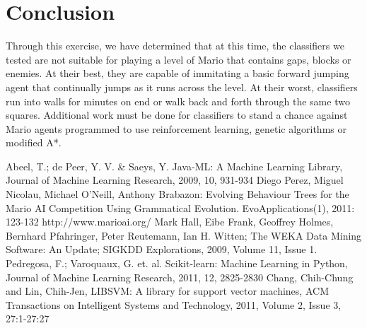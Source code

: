 \documentclass[]{article}   %
\begin{document}
\section{Conclusion}

Through this exercise, we have determined that at this time, the classifiers we tested are not suitable for playing a level of Mario that contains gaps, blocks or enemies.
At their best, they are capable of immitating a basic forward jumping agent that continually jumps as it runs across the level. At their worst, classifiers run into walls for
minutes on end or walk back and forth through the same two squares. Additional work must be done for classifiers to stand a chance against Mario agents programmed to use
reinforcement learning, genetic algorithms or modified A*.


\begin{thebibliography}{9}
  Abeel, T.; de Peer, Y. V. \& Saeys, Y. Java-ML: A Machine Learning Library, Journal of Machine Learning Research, 2009, 10, 931-934
  Diego Perez, Miguel Nicolau, Michael O'Neill, Anthony Brabazon: Evolving Behaviour Trees for the Mario AI Competition Using Grammatical Evolution. EvoApplications(1), 2011: 123-132 http://www.marioai.org/
  Mark Hall, Eibe Frank, Geoffrey Holmes, Bernhard Pfahringer, Peter Reutemann, Ian H. Witten; The WEKA Data Mining Software: An Update; SIGKDD Explorations, 2009, Volume 11, Issue 1.
  Pedregosa, F.; Varoquaux, G. et. al. Scikit-learn: Machine Learning in Python, Journal of Machine Learning Research, 2011, 12, 2825-2830
  Chang, Chih-Chung and Lin, Chih-Jen, {LIBSVM}: A library for support vector machines, ACM Transactions on Intelligent Systems and Technology, 2011, Volume 2, Issue 3, 27:1-27:27
\end{thebibliography}
\end{document}
